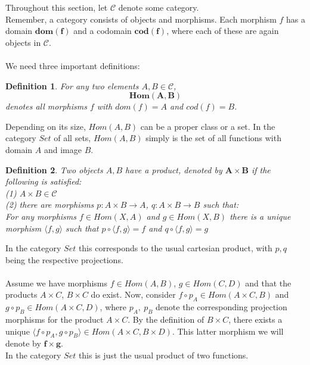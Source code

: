 \documentclass[17pt]{extarticle}
\newtheorem*{definition*}{Definition}
\begin{document}
Throughout this section, let $\mathcal{C}$ denote some category.\\
Remember, a category consists of objects and morphisms. Each morphism $f$ has a domain $\mathbf{dom(f)}$ and a codomain $\mathbf{cod(f)}$, where each of these are again objects in $\mathcal{C}$.\\ \\
We need three important definitions:\\
\begin{definition*}
	For any two elements $A,B\in \mathcal{C}$,
	$$\mathbf{Hom(A,B)}$$
	denotes all morphisms $f$ with $dom(f)=A$ and $cod(f)=B$.
\end{definition*}
Depending on its size,
$Hom(A,B)$ can be a proper class or a set. In the category $Set$ of all sets, $Hom(A,B)$ simply is the set of all functions with domain $A$ and image $B$.\\

\begin{definition*}
	Two objects $A,B$ have a product, denoted by $\mathbf{A\times B}$ if the following is satisfied:\\
	(1) $A\times B\in \mathcal{C}$\\ 
	(2) there are morphisms $p:A\times B\rightarrow A$, $q:A\times B\rightarrow B$ such that:\\
	For any morphisms $f\in Hom(X,A)$ and $g\in Hom(X,B)$ there is a unique morphism $\langle f,g\rangle$ such that $p\circ \langle f,g\rangle=f$ and $q\circ \langle f,g\rangle=g$	
\end{definition*}
In the category $Set$ this corresponds to the usual cartesian product, with $p,q$ being the respective projections.\\ \\
Assume we have morphisms $f\in Hom(A,B)$, $g\in Hom(C,D)$
and that the products $A\times C$, $B\times C$ do exist. Now, consider $f\circ p_A\in Hom(A\times C, B)$ and $g\circ p_B\in Hom(A\times C, D)$, where $p_A, \ p_B$ denote the corresponding projection morphisms for the product $A\times C$. By the definition of $B\times C$, there exists a unique $\langle f\circ p_A, g\circ p_B\rangle\in Hom(A\times C, B\times D)$. This latter morphism we will denote by $\mathbf{f\times g}$.\\
In the category $Set$ this is just the usual product of two functions.\\
\end{document}
